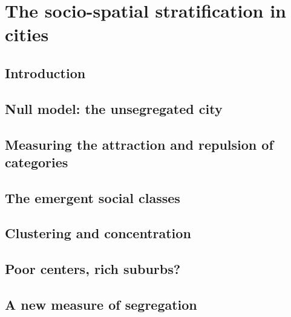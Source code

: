 %
\chapter{The socio-spatial stratification in cities}
\label{sec:concepts}


\section{Introduction}
\label{sec:introduction}

\section{Null model: the unsegregated city}
\label{sec:null_model_the_unsegregated_city}

\section{Measuring the attraction and repulsion of categories}
\label{sec:measuring_the_attraction_and_repulsion_of_categories}

\section{The emergent social classes}
\label{sec:the_emergent_social_classes}

\section{Clustering and concentration}
\label{sec:clustering_and_concentration}

\section{Poor centers, rich suburbs?}
\label{sec:poor_centers_rich_suburbs_}

\section{A new measure of segregation}
\label{sec:a_new_measure_of_segregation}
